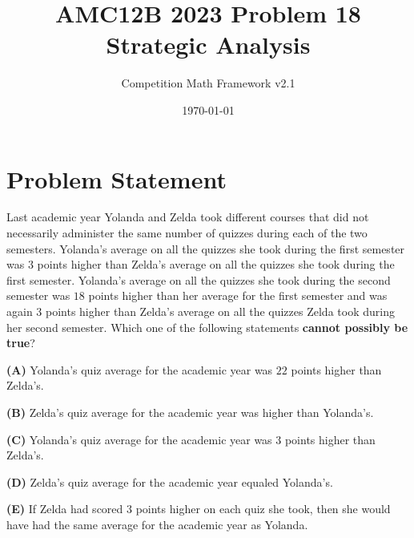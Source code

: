 \documentclass[12pt]{article}
\begin{document}
\title{AMC12B 2023 Problem 18\\Strategic Analysis}
\author{Competition Math Framework v2.1}
\date{\today}
\maketitle

\section*{Problem Statement}

Last academic year Yolanda and Zelda took different courses that did not necessarily administer the same number of quizzes during each of the two semesters. Yolanda's average on all the quizzes she took during the first semester was $3$ points higher than Zelda's average on all the quizzes she took during the first semester. Yolanda's average on all the quizzes she took during the second semester was $18$ points higher than her average for the first semester and was again $3$ points higher than Zelda's average on all the quizzes Zelda took during her second semester. Which one of the following statements \textbf{cannot possibly be true}?

\textbf{(A)} Yolanda's quiz average for the academic year was $22$ points higher than Zelda's.

\textbf{(B)} Zelda's quiz average for the academic year was higher than Yolanda's.

\textbf{(C)} Yolanda's quiz average for the academic year was $3$ points higher than Zelda's.

\textbf{(D)} Zelda's quiz average for the academic year equaled Yolanda's.

\textbf{(E)} If Zelda had scored $3$ points higher on each quiz she took, then she would have had the same average for the academic year as Yolanda.
\end{document}
